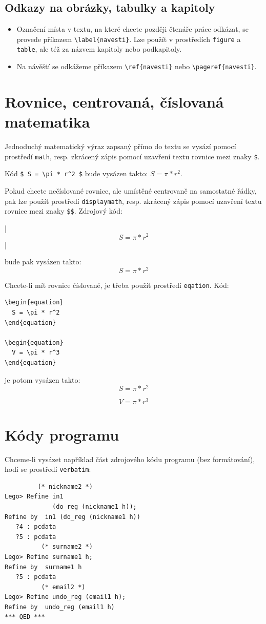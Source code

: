 \documentclass[11pt,twoside,a4paper]{book}
\begin{document}
\subsection{Odkazy na obrázky, tabulky a kapitoly}
\begin{itemize}
\item Označení místa v textu, na které chcete později čtenáře práce odkázat, se provede příkazem \verb|\label{navesti}|. Lze použít v prostředích \verb|figure| a  \verb|table|, ale též za názvem kapitoly nebo podkapitoly.
\item Na návěští se odkážeme příkazem \verb|\ref{navesti}| nebo \verb|\pageref{navesti}|.
\end{itemize}

\section{Rovnice, centrovaná, číslovaná matematika}
Jednoduchý matematický výraz zapsaný přímo do textu se vysází pomocí prostředí \verb|math|, resp. zkrácený zápis pomocí uzavření textu rovnice mezi znaky \verb|$|.

Kód \verb|$ S = \pi * r^2 $| bude vysázen takto: $ S = \pi * r^2 $.

Pokud chcete nečíslované rovnice, ale umístěné centrovaně na samostatné řádky, pak lze použít prostředí \verb|displaymath|, resp. zkrácený zápis pomocí uzavření textu rovnice mezi znaky \verb|$$|. Zdrojový kód: 
\begin{verb}
|$$ S = \pi * r^2 $$|
\end{verb}
bude pak vysázen takto:
$$ S = \pi * r^2 $$

Chcete-li mít rovnice číslované, je třeba použít prostředí \verb|eqation|. Kód:
\begin{verbatim}
\begin{equation}
  S = \pi * r^2
\end{equation}

\begin{equation}
  V = \pi * r^3
\end{equation}
\end{verbatim}
je potom vysázen takto:
\begin{equation}
  S = \pi * r^2
\end{equation}

\begin{equation}
  V = \pi * r^3
\end{equation}

\section{Kódy programu}
Chceme-li vysázet například část zdrojového kódu programu (bez formátování), hodí se prostředí \verb|verbatim|: 
\begin{verbatim}
         (* nickname2 *)
Lego> Refine in1
             (do_reg (nickname1 h));
Refine by  in1 (do_reg (nickname1 h))
   ?4 : pcdata
   ?5 : pcdata
          (* surname2 *)
Lego> Refine surname1 h;
Refine by  surname1 h
   ?5 : pcdata
          (* email2 *)
Lego> Refine undo_reg (email1 h);
Refine by  undo_reg (email1 h)
*** QED ***
\end{verbatim}
\end{document}
